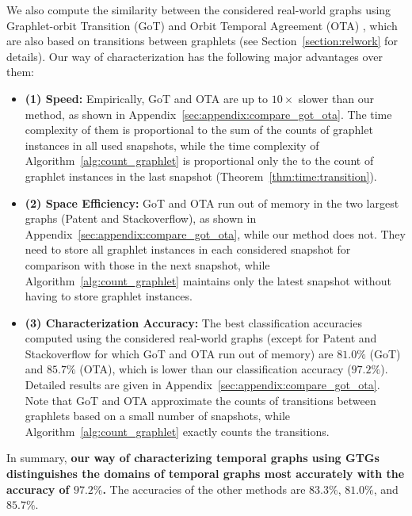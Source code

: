 We also compute the similarity between the considered real-world graphs using Graphlet-orbit Transition (GoT) \cite{aparicio2018graphlet} and Orbit Temporal Agreement (OTA) \cite{aparicio2018graphlet}, which are also based on transitions between graphlets (see Section~\ref{section:relwork} for details). 
Our way of characterization has the following major advantages over them:
\begin{itemize}
    \item \textbf{(1) Speed:} Empirically, GoT and OTA are up to $10\times$ slower than our method, as shown in Appendix~\ref{sec:appendix:compare_got_ota}.
The time complexity of them is proportional to the sum of the counts of graphlet instances in all used snapshots, while the time complexity of Algorithm~\ref{alg:count_graphlet} is proportional only the to the count of graphlet instances in the last snapshot (Theorem~\ref{thm:time:transition}).
    \item \textbf{(2) Space Efficiency:} GoT and OTA run out of memory in the two largest graphs (Patent and Stackoverflow), as shown in Appendix~\ref{sec:appendix:compare_got_ota}, while our method does not. They need to store all graphlet instances in each considered snapshot for comparison with those in the next snapshot, while Algorithm~\ref{alg:count_graphlet} maintains only the latest snapshot without having to store graphlet instances.
    \item \textbf{(3) Characterization Accuracy:} The best classification accuracies computed using the considered real-world graphs (except for Patent and Stackoverflow for which GoT and OTA run out of memory) are $81.0\%$ (GoT) and $85.7\%$ (OTA), which is lower than our classification accuracy ($97.2\%$). Detailed results are given in Appendix~\ref{sec:appendix:compare_got_ota}. Note that GoT and OTA approximate the counts of transitions between graphlets based on a small number of snapshots, while Algorithm~\ref{alg:count_graphlet} exactly counts the transitions.
\end{itemize}

In summary, \textbf{our way of characterizing temporal graphs using GTGs distinguishes the domains of temporal graphs most accurately with the accuracy of $97.2\%$.} The accuracies of the other methods are $83.3\%$, $81.0\%$, and $85.7\%$.

